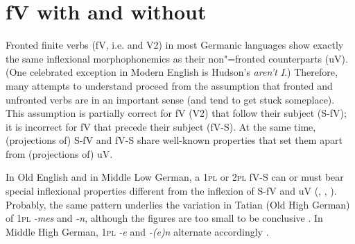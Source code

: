 \documentclass[output=paper]{LSP/langsci}
\begin{document}
\eal%
\settowidth{}
\label{ex:15-13}
\zl
\eal%
\settowidth{}
\label{ex:15-14}
\zl{}

\section{fV with and without }

\randnum\label{rn:15-27}Fronted finite verbs (fV, i.e.  and V2) in most Germanic languages
show exactly the same inflexional morphophonemics as their non"=fronted
counterparts (uV). (One celebrated exception in Modern English is
Hudson's \citeyear{Hudson1977} \textit{aren't I}.) Therefore, many attempts to understand  proceed from the assumption that fronted and unfronted verbs are in an important sense  (and tend to get stuck someplace). This assumption is partially correct for fV (V2) that follow their subject (S-fV); it is incorrect for  fV that precede their subject (\mbox{fV-S}). At the same time, (projections of) S-fV and \mbox{fV-S} share well-known properties that set them apart from (projections of) uV.

\randnum\label{rn:15-28}In Old English and in Middle Low German, a 1\textsc{pl} or 2\textsc{pl} \mbox{fV-S} can or must
bear special inflexional properties different from the inflexion of
S-fV and uV (\citealt{Brunner1965}, \citealt{Lasch1974}, \citealt{Sarauw1924}). Probably, the same pattern
underlies the variation in Tatian (Old High German) of 1\textsc{pl} \textit{-mes} and
\textit{-n}, although the figures are too small to be conclusive
\citep{Eggenberger1961}. In Middle High German, 1\textsc{pl} \textit{-e} and \textit{-(e)n} alternate accordingly \citep{Paul1989E}.
\end{document}
